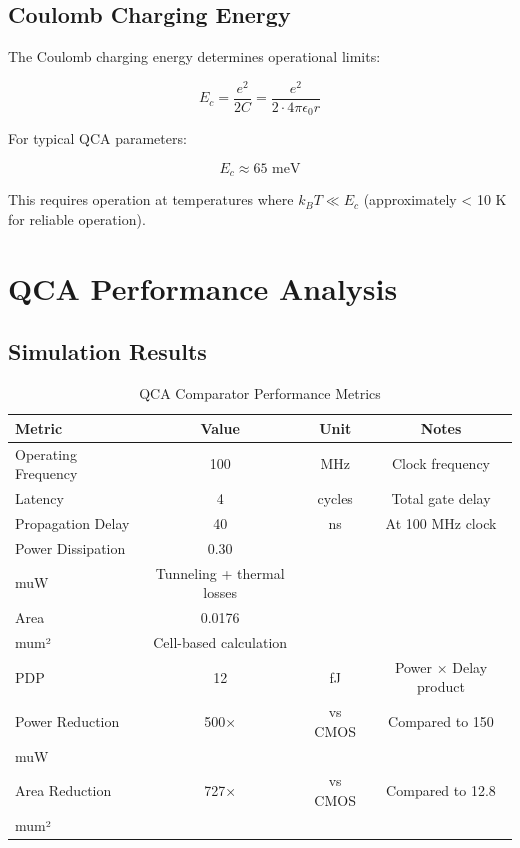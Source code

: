 \documentclass[12pt,a4paper,twoside]{report}
\begin{document}
\subsection{Coulomb Charging Energy}

The Coulomb charging energy determines operational limits:

\begin{equation}
E_c = \frac{e^2}{2C} = \frac{e^2}{2 \cdot 4\pi\epsilon_0 r}
\end{equation}

For typical QCA parameters:

\begin{equation}
E_c \approx 65 \text{ meV}
\end{equation}

This requires operation at temperatures where $k_B T \ll E_c$ (approximately < 10 K for reliable operation).

\section{QCA Performance Analysis}

\subsection{Simulation Results}

\begin{table}[H]
\centering
\caption{QCA Comparator Performance Metrics}
\label{tab:qca_perf}
\begin{tabularx}{\textwidth}{lccc}
\toprule
Metric & Value & Unit & Notes \\
\midrule
Operating Frequency & 100 & MHz & Clock frequency \\
Latency & 4 & cycles & Total gate delay \\
Propagation Delay & 40 & ns & At 100 MHz clock \\
Power Dissipation & 0.30 & \\muW & Tunneling + thermal losses \\
Area & 0.0176 & \\mum² & Cell-based calculation \\
PDP & 12 & fJ & Power × Delay product \\
Power Reduction & 500× & vs CMOS & Compared to 150 \\muW \\
Area Reduction & 727× & vs CMOS & Compared to 12.8 \\mum² \\
\bottomrule
\end{tabularx}
\end{table}
\end{document}
